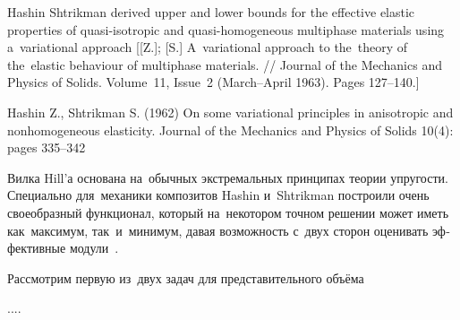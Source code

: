 
\label{section:composites.hashin-shtrikman-principle}

{\small
\noindent
Hashin  Shtrikman derived upper and lower bounds for the effective elastic properties of quasi-isotropic and quasi-homogeneous multiphase materials using a~variational approach [[Z.]; [S.] A~variational approach to the~theory of the~elastic behaviour of multiphase materials. // Journal of the Mechanics and Physics of Solids. Volume~11, Issue~2 (March--April 1963). Pages 127\hbox{--}140.]

Hashin Z., Shtrikman S. (1962) On some variational principles in anisotropic and nonhomogeneous elasticity. Journal of the Mechanics and Physics of Solids 10(4): pages 335–342
\par}

\begin{otherlanguage}{russian}

Вилка Hill’а основана на~обычных экстремальных принципах теории упругости.
Специально для~механики композитов Hashin и~Shtrikman построили очень своеобразный функционал, который на~некотором точном решении может иметь как~максимум, так~и~минимум, давая возможность с~двух сторон оценивать эффективные модули~\cite{shermergor}.

Рассмотрим первую из~двух задач для представительного объёма

....



\end{otherlanguage}

\section*{\small \wordforbibliography}

